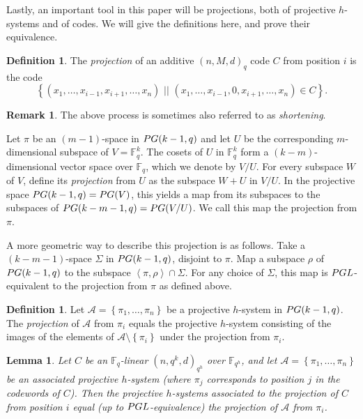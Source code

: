 \documentclass[a4paper]{article}
\newtheorem{lm}[thm]{Lemma}
\theoremstyle{definition}
\newtheorem{rmk}[thm]{Remark}
\newtheorem{df}[thm]{Definition}
\newcommand{\FF}{\mathbb F}
\newcommand{\vspan}[1]{\left \langle #1 \right \rangle}
\newcommand{\set}[1]{ \left \{ #1 \right \} }
\newcommand{\sett}[2]{ \left\{ #1 \, \, || \, \, #2 \right \} }
\newcommand{\pg}{\textnormal{PG}}
\newcommand{\ma}{\mathcal A}
\newcommand{\pgl}{\textnormal{PGL}}
\begin{document}
Lastly, an important tool in this paper will be projections, both of projective $h$-systems and of codes.
We will give the definitions here, and prove their equivalence.

\begin{df}
 The \emph{projection} of an additive $(n,M,d)_q$ code $C$ from position $i$ is the code
 \[
  \sett{(x_1, \dots, x_{i-1}, x_{i+1}, \dots, x_n)}{(x_1, \dots, x_{i-1}, 0, x_{i+1}, \dots, x_n) \in C}.
 \]
\end{df}

\begin{rmk}
 The above process is sometimes also referred to as \emph{shortening}.
\end{rmk}

Let $\pi$ be an $(m-1)$-space in $\pg(k-1,q)$ and let $U$ be the corresponding $m$-dimensional subspace of $V = \FF_q^k$.
The cosets of $U$ in $\FF_q^k$ form a $(k-m)$-dimensional vector space over $\FF_q$, which we denote by $V / U$.
For every subspace $W$ of $V$, define its \emph{projection} from $U$ as the subspace $W+U$ in $V / U$.
In the projective space $\pg(k-1,q) = \pg(V)$, this yields a map from its subspaces to the subspaces of $\pg(k-m-1,q) = \pg(V/U)$.
We call this map the projection from $\pi$.

A more geometric way to describe this projection is as follows.
Take a $(k-m-1)$-space $\Sigma$ in $\pg(k-1,q)$, disjoint to $\pi$.
Map a subspace $\rho$ of $\pg(k-1,q)$ to the subspace $\vspan{\pi,\rho} \cap \Sigma$.
For any choice of $\Sigma$, this map is $\pgl$-equivalent to the projection from $\pi$ as defined above.

\begin{df}
 Let $\ma = \set{\pi_1, \dots, \pi_n}$ be a projective $h$-system in $\pg(k-1,q)$.
 The \emph{projection} of $\ma$ from $\pi_i$ equals the projective $h$-system consisting of the images of the elements of $\ma \setminus \set {\pi_i}$ under the projection from $\pi_i$.
\end{df}

\begin{lm}
 \label{LmProjDifferentDef}
Let $C$ be an $\FF_q$-linear $(n,q^k,d)_{q^h}$ over $\FF_{q^h}$, and let $\ma = \set{\pi_1, \dots, \pi_n}$ be an associated projective $h$-system (where $\pi_j$ corresponds to position $j$ in the codewords of $C$).
Then the projective $h$-systems associated to the projection of $C$ from position $i$ equal (up to $\pgl$-equivalence) the projection of $\ma$ from $\pi_i$.
\end{lm}
\end{document}
